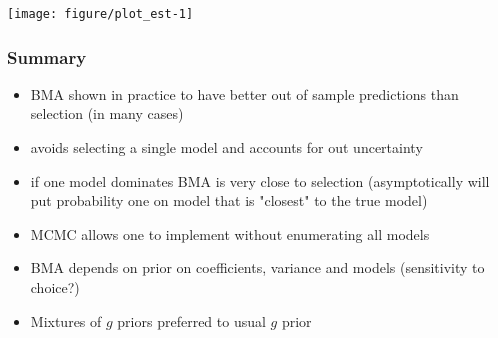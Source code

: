 \documentclass[handout]{beamer}\usepackage[]{graphicx}\usepackage[]{color}
\makeatletter
\def\maxwidth{ %
  \ifdim\Gin@nat@width>\linewidth
    \linewidth
  \else
    \Gin@nat@width
  \fi
}
\newenvironment{knitrout}{}{} %
\makeatother
\begin{document}
\begin{frame}[fragile] %
\begin{knitrout}
\color{fgcolor}

{\centering \texttt{[image: figure/plot\_est-1]} 

}



\end{knitrout}
\end{frame}

\begin{frame} \frametitle{Summary}

\begin{itemize}
\item BMA shown in practice to have better out of sample predictions than selection (in many cases) \pause
\item avoids selecting a single model and accounts for out uncertainty \pause
\item if one model dominates BMA is very close to selection  (asymptotically will put probability one on model that is "closest" to the true model) \pause
\item MCMC allows one to implement without enumerating all models \pause
\item BMA depends on prior on coefficients, variance and models  (sensitivity to choice?) \pause
\item Mixtures of $g$ priors preferred to usual $g$ prior
\end{itemize}
\end{frame}
\end{document}
